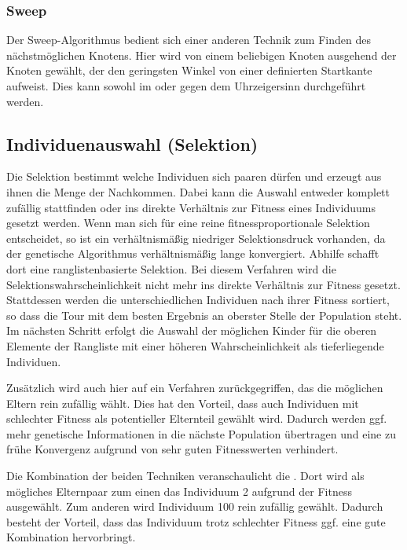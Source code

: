 \subsubsection{Sweep}
Der Sweep-Algorithmus bedient sich einer anderen Technik zum Finden des nächstmöglichen Knotens. Hier wird von einem beliebigen Knoten ausgehend der Knoten gewählt, der den geringsten Winkel von einer definierten Startkante aufweist. Dies kann sowohl im oder gegen dem Uhrzeigersinn durchgeführt werden.

\subsection{Individuenauswahl (Selektion)}
\label{sec:GenetischerSelektion}
Die Selektion bestimmt welche Individuen sich paaren dürfen und erzeugt aus ihnen die Menge der Nachkommen. Dabei kann die Auswahl entweder komplett zufällig stattfinden oder ins direkte Verhältnis zur Fitness eines Individuums gesetzt werden. Wenn man sich für eine reine fitnessproportionale Selektion entscheidet, so ist ein verhältnismäßig niedriger Selektionsdruck vorhanden, da der genetische Algorithmus verhältnismäßig lange konvergiert. Abhilfe schafft dort eine ranglistenbasierte Selektion. Bei diesem Verfahren wird die Selektionswahrscheinlichkeit nicht mehr ins direkte Verhältnis zur Fitness gesetzt. Stattdessen werden die unterschiedlichen Individuen nach ihrer Fitness sortiert, so dass die Tour mit dem besten Ergebnis an oberster Stelle der Population steht. Im nächsten Schritt erfolgt die Auswahl der möglichen Kinder für die oberen Elemente der Rangliste mit einer höheren Wahrscheinlichkeit als tieferliegende Individuen. 

Zusätzlich wird auch hier auf ein Verfahren zurückgegriffen, das die möglichen Eltern rein zufällig wählt. Dies hat den Vorteil, dass auch Individuen mit schlechter Fitness als potentieller Elternteil gewählt wird. Dadurch werden ggf. mehr genetische Informationen in die nächste Population übertragen und eine zu frühe Konvergenz aufgrund von sehr guten Fitnesswerten verhindert. 

Die Kombination der beiden Techniken veranschaulicht die . Dort wird als mögliches Elternpaar zum einen das Individuum 2 aufgrund der Fitness ausgewählt. Zum anderen wird Individuum 100 rein zufällig gewählt. Dadurch besteht der Vorteil, dass das Individuum trotz schlechter Fitness ggf. eine gute Kombination hervorbringt.


